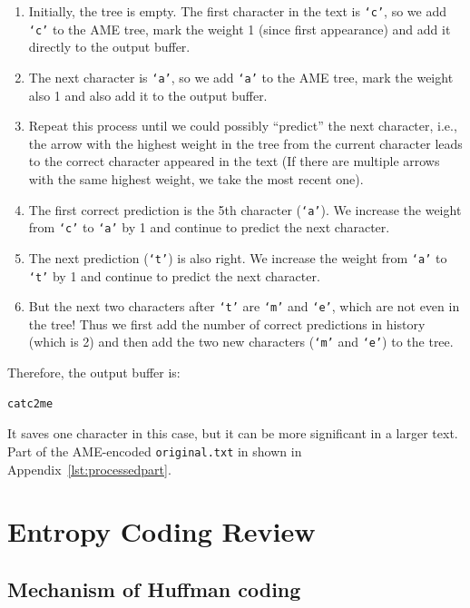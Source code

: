 \documentclass[12pt,twoside]{article}
\begin{document}
\begin{enumerate}
    \item Initially, the tree is empty. The first character in the text is \texttt{`c'}, so we add \texttt{`c'} to the AME tree, mark the weight 1 (since first appearance) and add it directly to the output buffer. 
    \item The next character is \texttt{`a'}, so we add \texttt{`a'} to the AME tree, mark the weight also 1 and also add it to the output buffer. 
    \item Repeat this process until we could possibly ``predict'' the next character, i.e., the arrow with the highest weight in the tree from the current character leads to the correct character appeared in the text (If there are multiple arrows with the same highest weight, we take the most recent one).
    \item The first correct prediction is the 5th character (\texttt{`a'}). We increase the weight from \texttt{`c'} to \texttt{`a'} by 1 and continue to predict the next character.
    \item The next prediction (\texttt{`t'}) is also right. We increase the weight from \texttt{`a'} to \texttt{`t'} by 1 and continue to predict the next character.
    \item But the next two characters after \texttt{`t'} are \texttt{`m'} and \texttt{`e'}, which are not even in the tree! Thus we first add the number of correct predictions in history (which is 2) and then add the two new characters (\texttt{`m'} and \texttt{`e'}) to the tree. 
\end{enumerate}

Therefore, the output buffer is:

\begin{lstlisting}[language=bash, style=custombash]
catc2me
\end{lstlisting}

It saves one character in this case, but it can be more significant in a larger text. Part of the AME-encoded \texttt{original.txt} in shown in Appendix~\ref{lst:processedpart}.


\section{Entropy Coding Review}
\subsection{Mechanism of Huffman coding}
\label{sec:huffman}
\end{document}
